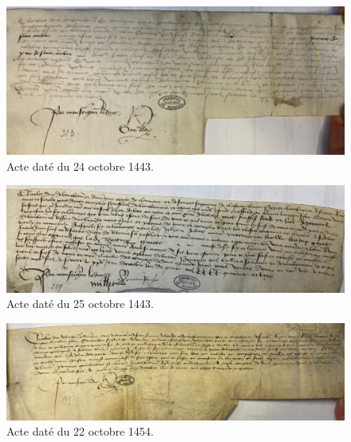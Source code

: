 \begin{figure}[ht]
\centering
\includegraphics[scale =0.12]{img/IMG-2573.jpg}
\caption*{Acte daté du 24 octobre 1443.}
\label{IMG-2573}
\end{figure}

\begin{figure}[ht]
\centering
\includegraphics[scale =0.12]{img/IMG-2558.jpg}
\caption*{Acte daté du 25 octobre 1443.}
\label{IMG-2558}
\end{figure}

\begin{figure}[ht]
\centering
\includegraphics[scale =0.12]{img/IMG-2547.jpg}
\caption*{Acte daté du 22 octobre 1454.}
\label{IMG-2547}
\end{figure}